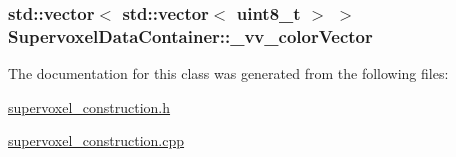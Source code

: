 \hypertarget{classSupervoxelDataContainer_abc7ed8d684b58d402c37e83a590469f5}{
\subsubsection[{\-\_\-vv\-\_\-color\-Vector}]{\setlength{\rightskip}{0pt plus 5cm}std\-::vector$<$ std\-::vector$<$ uint8\-\_\-t $>$ $>$ Supervoxel\-Data\-Container\-::\-\_\-vv\-\_\-color\-Vector}}\label{classSupervoxelDataContainer_abc7ed8d684b58d402c37e83a590469f5}


The documentation for this class was generated from the following files\-:\begin{DoxyCompactItemize}
\item 
\hyperlink{supervoxel__construction_8h}{supervoxel\-\_\-construction.\-h}\item 
\hyperlink{supervoxel__construction_8cpp}{supervoxel\-\_\-construction.\-cpp}\end{DoxyCompactItemize}

